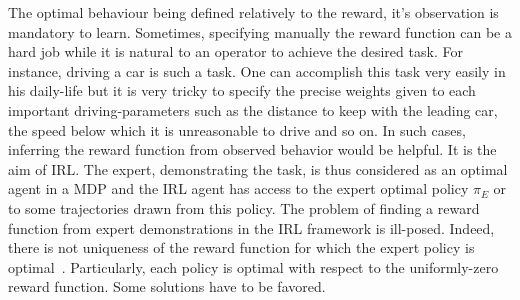 \documentclass{article}
\begin{document}
%
The optimal behaviour being defined relatively to the reward, it's
observation is mandatory to learn. Sometimes, specifying manually
the reward function can be a hard job while it is natural to an
operator to achieve the desired task. For instance, driving a car is
such a task. One can accomplish this task very easily in his
daily-life but it is very tricky to specify the precise weights
given to each important driving-parameters such as the distance to
keep with the leading car, the speed below which it is unreasonable
to drive and so on. In such cases, inferring the reward function
from observed behavior would be helpful.
%
%
It is the aim of IRL. The expert, demonstrating the task, is thus
considered as an optimal agent in a MDP and the IRL agent has access
to the expert optimal policy $\pi_E$ or to some trajectories drawn
from this policy.
%
The problem of finding a reward function from expert demonstrations
in the IRL framework is ill-posed. Indeed, there is not uniqueness
of the reward function for which the expert policy is
optimal~\cite{ng1999policyreward}. Particularly, each policy is
optimal with respect to the uniformly-zero reward function. Some
solutions have to be favored.
\end{document}
